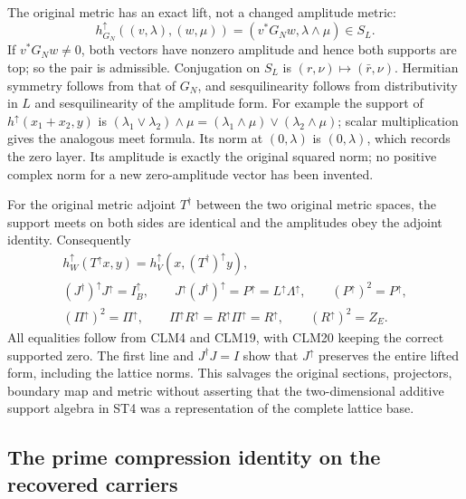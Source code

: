 \documentclass[11pt]{article}
\begin{document}
The original metric has an exact lift, not a changed amplitude metric:
\begin{equation}\tag{CLM21}
h^\uparrow_{G_N}((v,\lambda),(w,\mu))
 =(v^*G_Nw,\lambda\wedge\mu)\in S_L.
\end{equation}
If $v^*G_Nw\ne0$, both vectors have nonzero amplitude and hence both
supports are top; so the pair is admissible. Conjugation on $S_L$ is
$(r,\nu)\mapsto(\bar r,\nu)$. Hermitian symmetry follows from that
of $G_N$, and sesquilinearity follows from distributivity in $L$ and
sesquilinearity of the amplitude form. For example the support of
$h^\uparrow(x_1+x_2,y)$ is
$(\lambda_1\vee\lambda_2)\wedge\mu
=(\lambda_1\wedge\mu)\vee(\lambda_2\wedge\mu)$; scalar multiplication
gives the analogous meet formula. Its norm at $(0,\lambda)$ is
$(0,\lambda)$, which records the zero layer. Its amplitude is exactly
the original squared norm; no positive complex norm for a new
zero-amplitude vector has been invented.

For the original metric adjoint $T^\dagger$ between the two original
metric spaces, the support meets on both sides are identical and the
amplitudes obey the adjoint identity. Consequently
\begin{equation}\tag{CLM22}
\begin{gathered}
h_W^\uparrow(T^\uparrow x,y)=h_V^\uparrow(x,(T^\dagger)^\uparrow y),\\
(J^\dagger)^\uparrow J^\uparrow=I_B^\uparrow,\qquad
J^\uparrow(J^\dagger)^\uparrow=P^\uparrow
=L^\uparrow\Lambda^\uparrow,\qquad
(P^\uparrow)^2=P^\uparrow,\\
(\Pi^\uparrow)^2=\Pi^\uparrow,\qquad
\Pi^\uparrow R^\uparrow=R^\uparrow\Pi^\uparrow=R^\uparrow,
\qquad(R^\uparrow)^2=Z_E.
\end{gathered}
\end{equation}
All equalities follow from CLM4 and CLM19, with CLM20 keeping the
correct supported zero. The first line and $J^\dagger J=I$ show that
$J^\uparrow$ preserves the entire lifted form, including the lattice
norms. This salvages the original sections, projectors, boundary map
and metric without asserting that the two-dimensional additive support
algebra in ST4 was a representation of the complete lattice base.

\subsection{The prime compression identity on the recovered carriers}
\end{document}
